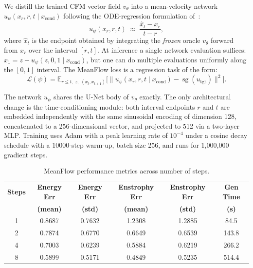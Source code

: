 \documentclass[oneside,11pt]{article}
\theoremstyle{remark}
\begin{document}
We distill the trained CFM vector field $v_\theta$ into a mean-velocity
network $u_\psi(x_r, r, t \mid x_{\mathrm{cond}})$ following the
ODE-regression formulation of~\cite{geng2025mean}:
\begin{equation}
    u_\psi(x_r, r, t) \;\approx\; \frac{\hat{x}_t - x_r}{t - r},
\end{equation}
where $\hat{x}_t$ is the endpoint obtained by integrating the \emph{frozen}
oracle $v_\theta$ forward from $x_r$ over the interval $[r,t]$.
At inference a single network evaluation suffices:
$x_1 = z + u_\psi(z, 0, 1 \mid x_{\mathrm{cond}})$, but one can do multiple evaluations uniformly along the $[0,1]$ interval.
The MeanFlow loss is a regression task of the form:
\begin{equation}
    \mathcal{L}(\psi)
    = \mathbb{E}_{r \leq t,\;z,\;(x_t,x_{t+1})}
      \bigl[\|u_\psi(x_r, r, t \mid x_{\mathrm{cond}})
             - \operatorname{sg}(u_{\mathrm{tgt}})\|^2\bigr].
\end{equation}

The network $u_\psi$ shares the U-Net body of $v_\theta$ exactly.
The only architectural change is the time-conditioning module: both
interval endpoints $r$ and $t$ are embedded independently with the same
sinusoidal encoding of dimension 128, concatenated to a 256-dimensional
vector, and projected to 512 via a two-layer MLP. Training uses Adam with a peak learning rate of $10^{-4}$ under a cosine
decay schedule with a 10000-step warm-up, batch size 256, and runs for
1,000,000 gradient steps.

\begin{table}[h]
\centering
\caption{MeanFlow performance metrics across number of steps.}
\label{tab:meanflow}
\begin{tabular}{cccccc}
\hline
\textbf{Steps} & \textbf{Energy Err} & \textbf{Energy Err} & \textbf{Enstrophy Err} & \textbf{Enstrophy Err} & \textbf{Gen Time} \\
 & \textbf{(mean)} & \textbf{(std)} & \textbf{(mean)} & \textbf{(std)} & \textbf{(s)} \\
\hline
1 & 0.8687 & 0.7632 & 1.2308 & 1.2885 & 84.5 \\
2 & 0.7874 & 0.6770 & 0.6649 & 0.6539 & 143.8 \\
4 & 0.7003 & 0.6239 & 0.5884 & 0.6219 & 266.2 \\
8 & 0.5899 & 0.5171 & 0.4849 & 0.5235 & 514.4 \\
\hline
\end{tabular}
\end{table}
\end{document}
